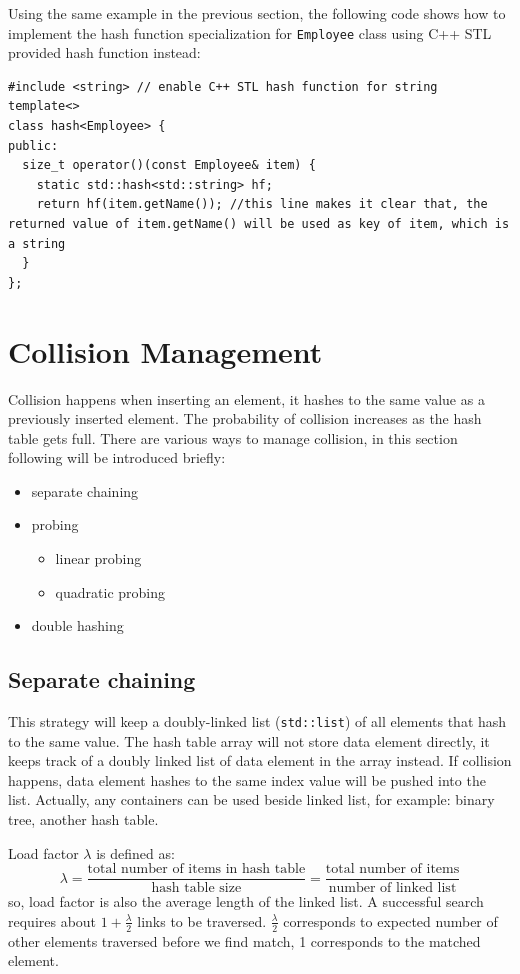 \documentclass[12pt]{book}
\begin{document}
Using the same example in the previous section, the following code shows how to implement the hash function specialization for \texttt{Employee} class using C++ STL provided hash function instead:
\begin{verbatim}
#include <string> // enable C++ STL hash function for string
template<>
class hash<Employee> {
public:
  size_t operator()(const Employee& item) {
    static std::hash<std::string> hf;
    return hf(item.getName()); //this line makes it clear that, the returned value of item.getName() will be used as key of item, which is a string
  }
};
\end{verbatim}

\section{Collision Management}
\label{sec:org66cea72}
Collision happens when inserting an element, it hashes to the same value as a previously inserted element. The probability of collision increases as the hash table gets full. There are various ways to manage collision, in this section following will be introduced briefly:
\begin{itemize}
\item separate chaining
\item probing
\begin{itemize}
\item linear probing
\item quadratic probing
\end{itemize}
\item double hashing
\end{itemize}

\subsection{Separate chaining}
\label{sec:org9645c43}

This strategy will keep a doubly-linked list (\texttt{std::list}) of all elements that hash to the same value. The hash table array will not store data element directly, it keeps track of a doubly linked list of data element in the array instead. If collision happens, data element hashes to the same index value will be pushed into the list. Actually, any containers can be used beside linked list, for example: binary tree, another hash table.

Load factor \(\lambda\) is defined as:
\[
\lambda = \frac {\text{total number of items in hash table}} {\text{hash table size}} = \frac {\text{total number of items}} {\text{number of linked list}}
\]
so, load factor is also the average length of the linked list. A successful search requires about \(1 + \frac {\lambda} {2}\) links to be traversed. \(\frac {\lambda} {2}\) corresponds to expected number of other elements traversed before we find match, 1 corresponds to the matched element.
\end{document}
